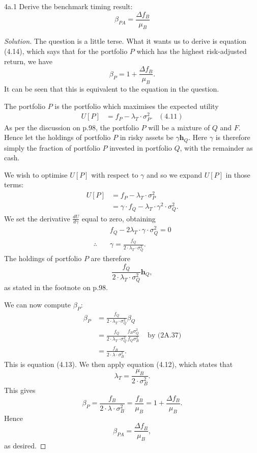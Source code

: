 
\begin{problem}{4a.1}
Derive the benchmark timing result: \[\beta_{PA} = \frac{\Delta f_{B}}{\mu_{B}}\]
\end{problem}

\begin{proof}[Solution]
The question is a little terse. What it wants us to derive is equation (4.14), which says that for the portfolio $P$ which has the highest risk-adjusted return, we have \[\beta_{P} = 1 + \frac{\Delta f_{B}}{\mu_{B}}.\] It can be seen that this is equivalent to the equation in the question.

The portfolio $P$ is the portfolio which maximises the expected utility
\begin{align*}
U[P] &= f_{P} - \lambda_{T} \cdot \sigma_{P}^{2}. & (4.11)
\end{align*}
As per the discussion on p.98, the portfolio $P$ will be a mixture of $Q$ and $F$. Hence let the holdings of portfolio $P$ in risky assets be $\gamma \mathbf{h}_{Q}$. Here $\gamma$ is therefore simply the fraction of portfolio $P$ invested in portfolio $Q$, with the remainder as cash.

We wish to optimise $U[P]$ with respect to $\gamma$ and so we expand $U[P]$ in those terms:
\begin{align*}
U[P] &= f_{P} - \lambda_{T} \cdot \sigma_{P}^{2}\\
&= \gamma \cdot f_{Q} - \lambda_{T} \cdot \gamma^{2} \cdot \sigma_{Q}^{2}.
\end{align*}
We set the derivative $\frac{dU}{d\gamma}$ equal to zero, obtaining
\begin{align*}
&f_{Q} - 2 \lambda_{T} \cdot \gamma \cdot \sigma_{Q}^{2} = 0 \\
\therefore \quad &\gamma = \frac{f_{Q}}{2 \cdot \lambda_{T} \cdot \sigma_{Q}^{2}}. 
\end{align*}
The holdings of portfolio $P$ are therefore \[\frac{f_{Q}}{2 \cdot \lambda_{T} \cdot \sigma_{Q}^{2}}\mathbf{h}_{Q},\] as stated in the footnote on p.98.

We can now compute $\beta_{P}$:
\begin{align*}
\beta_{P} &= \frac{f_{Q}}{2 \cdot \lambda_{T} \cdot \sigma_{Q}^{2}}\beta_{Q}\\
&= \frac{f_{Q}}{2 \cdot \lambda_{T} \cdot \sigma_{Q}^{2}} \frac{f_{B}\sigma_{Q}^{2}}{f_{Q}\sigma_{B}^{2}} & \text{ by (2A.37)}\\
&= \frac{f_{B}}{2 \cdot \lambda \cdot \sigma_{B}^{2}}.
\end{align*}
This is equation (4.13). We then apply equation (4.12), which states that \[\lambda_{T} = \frac{\mu_{B}}{2 \cdot \sigma_{B}^{2}}.\] This gives\[
\beta_{P} = \frac{f_{B}}{2 \cdot \lambda \cdot \sigma_{B}^{2}} = \frac{f_{B}}{\mu_{B}} = 1 + \frac{\Delta f_{B}}{\mu_{B}}.\]
Hence \[\beta_{PA} = \frac{\Delta f_{B}}{\mu_{B}},\] as desired.
\end{proof}

